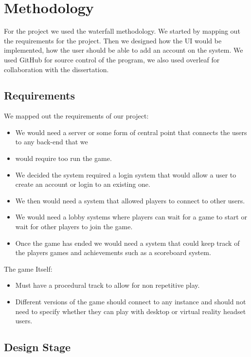
\chapter{Methodology}

For the project we used the waterfall methodology. We started by mapping out the requirements for the project. Then we designed how the UI would be implemented, how the user should be able to add an account on the system.  We used GitHub for source control of the program, we also used overleaf for collaboration with the dissertation. 

\newpage
\section{Requirements}

We mapped out the requirements of our project:
\begin{itemize}
\item We would need a server or some form of central point that connects the users to any back-end that we \item would require too run the game.
\item We decided the system required a login system that would allow a user to create an account or login to an existing one.
\item We then would need a system that allowed players to connect to other users.
\item We would need a lobby systems where players can wait for a game to start or wait for other players to join the game.
\item Once the game has ended we would need a system that could keep track of the players games and achievements such as a scoreboard system.
\end{itemize}


The game Itself:
\begin{itemize}
\item Must have a procedural track to allow for non repetitive play.
\item Different versions of the game should connect to any instance and should not need to specify whether they can play with desktop or virtual reality headset users.
\end{itemize}

\newpage
\section{Design Stage}

